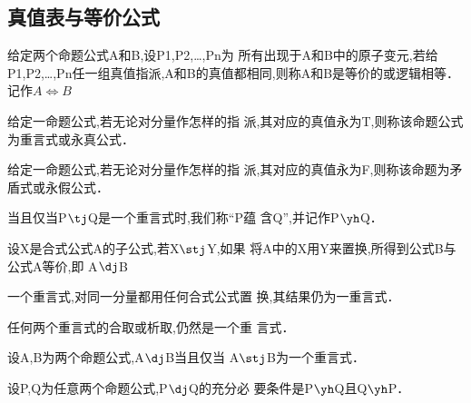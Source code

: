\subsection{真值表与等价公式}
\begin{definition}[真值表] \end{definition} 
\begin{definition}[等价或逻辑相等] 
给定两个命题公式A和B,设P1,P2,…,Pn为
所有出现于A和B中的原子变元,若给P1,P2,…,Pn任一组真值指派,A和B的真值都相同,则称A和B是等价的或逻辑相等．记作$A\Leftrightarrow B$
\end{definition} 
\begin{definition}[子公式] \end{definition} 

\begin{definition}
给定一命题公式,若无论对分量作怎样的指
派,其对应的真值永为T,则称该命题公式为重言式或永真公式．
 \end{definition} 
\begin{definition}
给定一命题公式,若无论对分量作怎样的指
派,其对应的真值永为F,则称该命题为矛盾式或永假公式．
 \end{definition} 

\begin{definition}[蕴含]
当且仅当P$\tj$Q是一个重言式时,我们称“P蕴
含Q”,并记作P$\yh$Q．
 \end{definition} 

\begin{theorem}
设X是合式公式A的子公式,若X$\stj$Y,如果
将A中的X用Y来置换,所得到公式B与公式A等价,即
A$\dj$B
\end{theorem} 


\begin{theorem} 
一个重言式,对同一分量都用任何合式公式置
换,其结果仍为一重言式．
\end{theorem} 

\begin{theorem} 
任何两个重言式的合取或析取,仍然是一个重
言式．
\end{theorem}
 
\begin{theorem} 
设A,B为两个命题公式,A$\dj$B当且仅当
A$\stj$B为一个重言式．
\end{theorem} 
\begin{theorem} 
设P,Q为任意两个命题公式,P$\dj$Q的充分必
要条件是P$\yh$Q且Q$\yh$P．

\end{theorem} 




